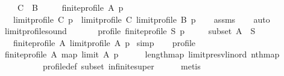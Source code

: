 \begin{isabellebody}
\ \ \ \ {\isachardoublequoteopen}C\ {\isasymsubseteq}\ B{\isachardoublequoteclose}\ \isanewline
\ \ \ \ {\isachardoublequoteopen}finite{\isacharunderscore}{\kern0pt}profile\ A\ p{\isachardoublequoteclose}\isanewline
\ \ \ {\isachardoublequoteopen}limit{\isacharunderscore}{\kern0pt}profile\ C\ p\ {\isacharequal}{\kern0pt}\ limit{\isacharunderscore}{\kern0pt}profile\ C\ {\isacharparenleft}{\kern0pt}limit{\isacharunderscore}{\kern0pt}profile\ B\ p{\isacharparenright}{\kern0pt}{\isachardoublequoteclose}\isanewline
%
\isadelimproof
\ \ %
\endisadelimproof
%
\isatagproof
{}\isamarkupfalse%
\ assms\isanewline
\ \ \isamarkupfalse%
\ auto%
\endisatagproof
{\isafoldproof}%
%
\isadelimproof
\isanewline
%
\endisadelimproof
\isanewline
{}\isamarkupfalse%
\ limit{\isacharunderscore}{\kern0pt}profile{\isacharunderscore}{\kern0pt}sound{\isacharcolon}{\kern0pt}\isanewline
\ \ \isanewline
\ \ \ \ profile{\isacharcolon}{\kern0pt}\ {\isachardoublequoteopen}finite{\isacharunderscore}{\kern0pt}profile\ S\ p{\isachardoublequoteclose}\ \isanewline
\ \ \ \ subset{\isacharcolon}{\kern0pt}\ {\isachardoublequoteopen}A\ {\isasymsubseteq}\ S{\isachardoublequoteclose}\isanewline
\ \ \ {\isachardoublequoteopen}finite{\isacharunderscore}{\kern0pt}profile\ A\ {\isacharparenleft}{\kern0pt}limit{\isacharunderscore}{\kern0pt}profile\ A\ p{\isacharparenright}{\kern0pt}{\isachardoublequoteclose}\isanewline
%
\isadelimproof
%
\endisadelimproof
%
\isatagproof
{}\isamarkupfalse%
\ {\isacharparenleft}{\kern0pt}simp{\isacharparenright}{\kern0pt}\isanewline
\ \ \isamarkupfalse%
\ profile\isanewline
\ \ \isamarkupfalse%
\ {\isachardoublequoteopen}finite{\isacharunderscore}{\kern0pt}profile\ A\ {\isacharparenleft}{\kern0pt}map\ {\isacharparenleft}{\kern0pt}limit\ A{\isacharparenright}{\kern0pt}\ p{\isacharparenright}{\kern0pt}{\isachardoublequoteclose}\isanewline
\ \ \ \ \isamarkupfalse%
\ length{\isacharunderscore}{\kern0pt}map\ limit{\isacharunderscore}{\kern0pt}presv{\isacharunderscore}{\kern0pt}lin{\isacharunderscore}{\kern0pt}ord\ nth{\isacharunderscore}{\kern0pt}map\isanewline
\ \ \ \ \ \ \ \ \ \ profile{\isacharunderscore}{\kern0pt}def\ subset\ infinite{\isacharunderscore}{\kern0pt}super\isanewline
\ \ \ \ \isamarkupfalse%
\ metis\isanewline
{}\isamarkupfalse%
%
\endisatagproof
{\isafoldproof}%
%
\isadelimproof
\isanewline
%
\endisadelimproof
\isanewline
{}\isamarkupfalse%

\end{isabellebody}
